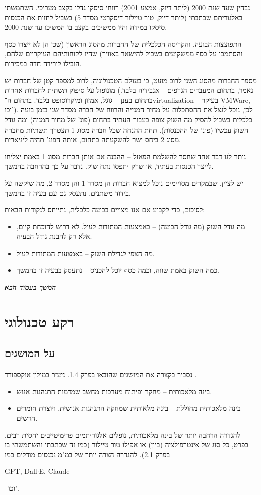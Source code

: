 \documentclass[]{article}
\newcommand\en[1] {\begin{otherlanguage}{english}#1\end{otherlanguage}}
\newcommand\npage {\vfil {\hfil \textbf{\textit{המשך בעמוד הבא}}} \hfil \vfil \pagebreak}
\theoremstyle{definition}
\begin{document}
\begin{multicols}{2}
		נבחין שעד שנת 2000 (ליתר דיוק, אמצע 2001) רווחי סיסקו גדלו בקצב מעריכי. השתמשתי באלגוריתם שכתבתי (ליתר דיוק, טור טיילור דיסקרטי מסדר 5) בשביל לחזות את הכנסות סיסקו במידה והיו ממשיכים בקצב בו המשיכו עד שנת 2000.
		
		התפוצצות הבועה, והקריסה הכלכלית של החברות מהסוג הראשון (שכן הן לא ייצרו כסף והסתמכו על כסף ממשקיעים בשביל להישאר באוויר) שהיו לקוחותיהם העיקריים שלהם, הובילו לירידה חדה במכירות. 
		
		
		מספר החברות מהסוג השני לרוב מועט, כי בעולם הטכנולוגיה, לרוב למספר קטן של חברות יש מונופול על סיפוק תשתית לחברות אחרות (נאמר, בתחום המעבדים הגרפים – אנבידיה בלבד. בתחום בענן – גוגל, אמזון ומיקרוסופט בלבד. בתחום ה־virtualization – בעיקר VMWare, וכו'). לכן, נוכל לנצל את ההסתכלות על מחיר המנייה והרווח של חברה מסדר שני בזמן בועה כלכלית בשביל להסיק מה השוק צופה בעבור העתיד בתחום (פונ' של מחיר המניה) ומה גודל השוק עכשיו (פונ' של ההכנסות). תחת ההנחה שכל חברה מסוג 1 תצטרך תשתיות מחברה מסוג 2 ביחס ישר להשקעתה בתחום, אותה הפונ' תהיה ליניארית. 
		
		נותר לנו דבר אחד שחסר להשלמת הפאזל – ההבנה אם אותן חברות מסוג 1 באמת יצליחו לייצר הכנסות בעתיד, או שרק יתפסו נתח שוק. נדבר על כך בהרחבה בהמשך. 
		
		יש לציין, שבמקרים מסויימים נוכל למצוא חברות הן מסדר 1 והן מסדר 2, מה שיקשה על בידוד משתנים. נתעסק גם עם בעיה זו בהמשך. 
		
		לסיכום, כדי לקבוע אם אנו מצויים בבועה כלכלית, נתייחס לנקודות הבאות: 
		\begin{itemize}
			\item מה גודל השוק (מה גודל הבועה) – באמצעות המתודות לעיל. לא דרוש להוכחת קיום, אלא רק להבנת גודל הבעיה. 
			\item מה הצפי לגדילת השוק – באמצעות המתודות לעיל. 
			\item כמה השוק באמת שווה, וכמה כסף יוכל להכניס – נתעסק בבעיה זו בהמשך. 
		\end{itemize}
	\end{multicols}
	
	\npage
	
	\section{רקע טכנולוגי}
	
	\subsection{על המושגים}
	נסביר בקצרה את המושגים שהובאו בפרק 1.4. ניעזר במילון אוקספורד \cite{OxfordDict}. 
	\begin{itemize}
		\item בינה מלאכותית – מחקר ופיתוח מערכות מחשב שמדמות התנהגות אנוש. 
		\item בינה מלאכותית מחוללת – בינה מלאותית שמחקה התנהגות אנושית, ויוצרת חומרים חדשים. 
	\end{itemize}
	להגדרה הרחבה יותר של בינה מלאכותית, נופלים אלגוריתמים פרימיטייבים יחסית רבים. בפרט, כל סוג של אינטרפולציה (ביון) או אפילו טור טיילור (כמו זה שכתבתי והשתמשתי בו בפרק 2.1). להגדרה הצרה יותר של במ"מ נכנסים מודלים כמו \en{GPT, Dall$\cdot$E, Claude}\,  וכו'. 
	
\end{document}
